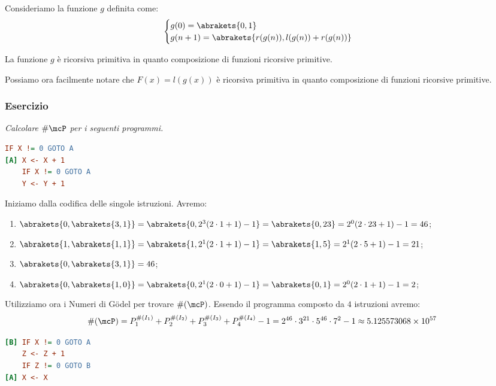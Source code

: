 Consideriamo la funzione \(g\) definita come:
\begin{equation}
    \begin{cases}
        g(0)=\abrakets{ 0,1 }\\
        g(n+1)=\abrakets{ r(g(n)),l(g(n))+r(g(n)) }
    \end{cases}
    \label{Funzione Fibonacci Eq}
\end{equation}

La funzione \(g\) è ricorsiva primitiva in quanto composizione di funzioni ricorsive primitive.

Possiamo ora facilmente notare che \(F(x) = l(g(x))\) è ricorsiva primitiva in quanto composizione di funzioni ricorsive primitive.

\subsubsection*{Esercizio} \textit{Calcolare \(\#\mcP\) per i seguenti programmi.}
\begin{lstlisting}[language=ini, label={Codifica 1 es}, caption= Esercizio Codifica Programmi 1]
    IF X != 0 GOTO A
[A] X <- X + 1
    IF X != 0 GOTO A
    Y <- Y + 1
\end{lstlisting}

Iniziamo dalla codifica delle singole istruzioni. Avremo:
\begin{enumerate}
    \item \(\abrakets{ 0,\abrakets{ 3,1}}= \abrakets{ 0,2^3(2\cdot 1 +1)-1} = \abrakets{ 0,23} = 2^0(2\cdot 23 + 1) - 1 = 46\);
    \item \(\abrakets{ 1,\abrakets{ 1,1}}= \abrakets{ 1,2^1(2\cdot 1 +1)-1} = \abrakets{ 1,5} = 2^1(2\cdot 5 + 1) - 1 = 21\);
    \item \(\abrakets{ 0,\abrakets{ 3,1}}= 46\);
    \item \(\abrakets{ 0,\abrakets{ 1,0}}= \abrakets{ 0,2^1(2\cdot 0 +1)-1} = \abrakets{ 0,1} = 2^0(2\cdot 1 + 1) - 1 = 2\);
\end{enumerate}
Utilizziamo ora i Numeri di Gödel per trovare \(\# (\mcP)\). Essendo il programma composto da \(4\) istruzioni avremo:
\begin{equation}
    \# (\mcP) = P_1^{\# (I_1)} + P_2^{\# (I_2)} + P_3^{\# (I_3)} + P_4^{\# (I_4)}-1= 2^{46} \cdot 3^{21} \cdot 5^{46} \cdot 7^2 - 1\approx 5.125573068 \times  10^{57}
\end{equation}

\begin{lstlisting}[language=ini, label={Codifica 2 es},  caption= Esercizio Codifica Programmi 1]
[B] IF X != 0 GOTO A
    Z <- Z + 1
    IF Z != 0 GOTO B
[A] X <- X
\end{lstlisting}

